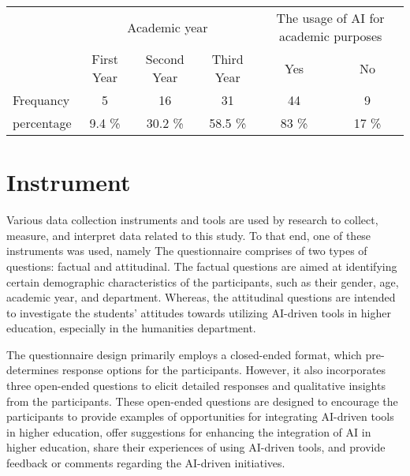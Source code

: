 \begin{table}[H]
	\begin{tabular}{l|ccc|cc|}
		\cline{2-6}
		\multirow{2}{*}{}                & \multicolumn{3}{c|}{Academic year} & \multicolumn{2}{c|}{The usage of AI for academic purposes}                                                                                             \\ \cline{2-6}
		                                 & \multicolumn{1}{c|}{First Year}    & \multicolumn{1}{c|}{Second Year}                           & \multicolumn{1}{c|}{Third Year} & \multicolumn{1}{c|}{Yes}   & \multicolumn{1}{c|}{No}    \\ \hline
		\multicolumn{1}{|l|}{Frequancy}  & \multicolumn{1}{c|}{5}             & \multicolumn{1}{c|}{16}                                    & \multicolumn{1}{c|}{31}         & \multicolumn{1}{c|}{44}    & \multicolumn{1}{c|}{9}     \\ \hline
		\multicolumn{1}{|l|}{percentage} & \multicolumn{1}{c|}{9.4 \%}        & \multicolumn{1}{c|}{30.2 \%}                               & \multicolumn{1}{c|}{58.5 \%}    & \multicolumn{1}{c|}{83 \%} & \multicolumn{1}{c|}{17 \%} \\ \hline
	\end{tabular}
\end{table}


\section{Instrument}
\justifying

Various data collection instruments and tools are used by research to collect, measure, and interpret data related to this study.
To that end, one of these instruments was used, namely  The questionnaire comprises of two types
of questions: factual and attitudinal. The factual questions are aimed at identifying certain demographic characteristics
of the participants, such as their gender, age, academic year, and department. Whereas, the attitudinal questions
are intended to investigate the students' attitudes towards utilizing AI-driven tools in higher education,
especially in the humanities department.


The questionnaire design primarily employs a closed-ended format, which pre-determines response
options for the participants. However, it also incorporates three open-ended questions to elicit
detailed responses and qualitative insights from the participants. These open-ended questions are
designed to encourage the participants to provide examples of opportunities for integrating AI-driven
tools in higher education, offer suggestions for enhancing the integration of AI in higher education,
share their experiences of using AI-driven tools, and provide feedback or comments regarding the AI-driven initiatives.


